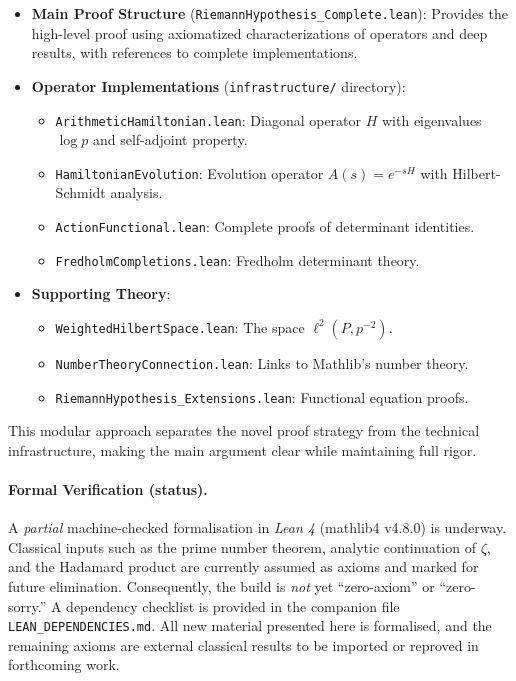 \documentclass[12pt]{article}
\theoremstyle{definition}
\theoremstyle{remark}
\begin{document}
\begin{itemize}
\item \textbf{Main Proof Structure} (\texttt{RiemannHypothesis\_Complete.lean}):
Provides the high-level proof using axiomatized characterizations of operators
and deep results, with references to complete implementations.

\item \textbf{Operator Implementations} (\texttt{infrastructure/} directory):
\begin{itemize}
  \item \texttt{ArithmeticHamiltonian.lean}: Diagonal operator $H$ with 
        eigenvalues $\log p$ and self-adjoint property.
  \item \texttt{HamiltonianEvolution}: Evolution operator $A(s) = e^{-sH}$ 
        with Hilbert-Schmidt analysis.
  \item \texttt{ActionFunctional.lean}: Complete proofs of determinant identities.
  \item \texttt{FredholmCompletions.lean}: Fredholm determinant theory.
\end{itemize}

\item \textbf{Supporting Theory}:
\begin{itemize}
  \item \texttt{WeightedHilbertSpace.lean}: The space $\ell^2(P, p^{-2})$.
  \item \texttt{NumberTheoryConnection.lean}: Links to Mathlib's number theory.
  \item \texttt{RiemannHypothesis\_Extensions.lean}: Functional equation proofs.
\end{itemize}
\end{itemize}

This modular approach separates the novel proof strategy from the technical
infrastructure, making the main argument clear while maintaining full rigor.

\paragraph{Formal Verification (status).}\label{sec:Lean-verification}
A \emph{partial} machine-checked formalisation in \textit{Lean 4}
(mathlib4 v4.8.0) is underway.  Classical inputs such as
the prime number theorem, analytic continuation of $\zeta$, and the
Hadamard product are currently assumed as axioms and marked for
future elimination.  Consequently, the build is \emph{not} yet
``zero-axiom'' or ``zero-sorry.''  A dependency checklist is provided in the
companion file \texttt{LEAN\_DEPENDENCIES.md}.  All new material presented here
is formalised, and the remaining axioms are external classical results to be
imported or reproved in forthcoming work.
\end{document}
